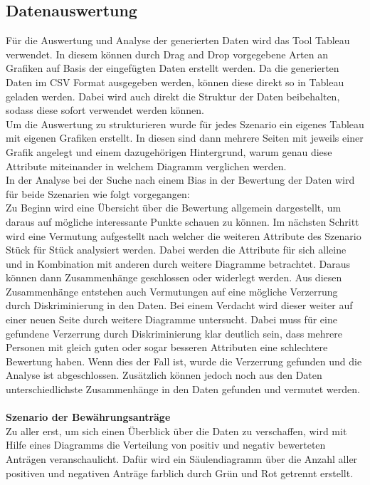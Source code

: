 \begin{onehalfspace}
\section{Datenauswertung}
\label{datenauswertung}
Für die Auswertung und Analyse der generierten Daten wird das Tool Tableau verwendet. In diesem können durch Drag and Drop vorgegebene Arten an Grafiken auf Basis der eingefügten Daten erstellt werden. Da die generierten Daten im CSV Format ausgegeben werden, können diese direkt so in Tableau geladen werden. Dabei wird auch direkt die Struktur der Daten beibehalten, sodass diese sofort verwendet werden können.\\
Um die Auswertung zu strukturieren wurde für jedes Szenario ein eigenes Tableau mit eigenen Grafiken erstellt. In diesen sind dann mehrere Seiten mit jeweils einer Grafik angelegt und einem dazugehörigen Hintergrund, warum genau diese Attribute miteinander in welchem Diagramm verglichen werden.\\
In der Analyse bei der Suche nach einem Bias in der Bewertung der Daten wird für beide Szenarien wie folgt vorgegangen:\\
Zu Beginn wird eine Übersicht über die Bewertung allgemein dargestellt, um daraus auf mögliche interessante Punkte schauen zu können. Im nächsten Schritt wird eine Vermutung aufgestellt nach welcher die weiteren Attribute des Szenario Stück für Stück analysiert werden. Dabei werden die Attribute für sich alleine und in Kombination mit anderen durch weitere Diagramme betrachtet. Daraus können dann Zusammenhänge geschlossen oder widerlegt werden. Aus diesen Zusammenhänge entstehen auch Vermutungen auf eine mögliche Verzerrung durch Diskriminierung in den Daten. Bei einem Verdacht wird dieser weiter auf einer neuen Seite durch weitere Diagramme untersucht. Dabei muss für eine gefundene Verzerrung durch Diskriminierung klar deutlich sein, dass mehrere Personen mit gleich guten oder sogar besseren Attributen eine schlechtere Bewertung haben. Wenn dies der Fall ist, wurde die Verzerrung gefunden und die Analyse ist abgeschlossen. Zusätzlich können jedoch noch aus den Daten unterschiedlichste Zusammenhänge in den Daten gefunden und vermutet werden.\\\\
\textbf{Szenario der Bewährungsanträge}\\
Zu aller erst, um sich einen Überblick über die Daten zu verschaffen, wird mit Hilfe eines Diagramms die Verteilung von positiv und negativ bewerteten Anträgen veranschaulicht. Dafür wird ein Säulendiagramm über die Anzahl aller positiven und negativen Anträge farblich durch Grün und Rot getrennt erstellt.\\

\end{onehalfspace}
